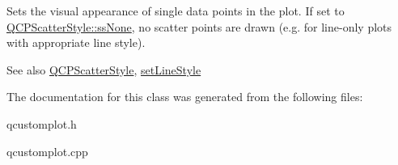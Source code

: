 Sets the visual appearance of single data points in the plot. If set to \hyperlink{classQCPScatterStyle_adb31525af6b680e6f1b7472e43859349abd144c291ca274f77053ec68cab6c022}{Q\+C\+P\+Scatter\+Style\+::ss\+None}, no scatter points are drawn (e.\+g. for line-\/only plots with appropriate line style).

\begin{DoxySeeAlso}{See also}
\hyperlink{classQCPScatterStyle}{Q\+C\+P\+Scatter\+Style}, \hyperlink{classQCPCurve_a4a377ec863ff81a1875c3094a6177c19}{set\+Line\+Style} 
\end{DoxySeeAlso}


The documentation for this class was generated from the following files\+:\begin{DoxyCompactItemize}
\item 
qcustomplot.\+h\item 
qcustomplot.\+cpp\end{DoxyCompactItemize}
